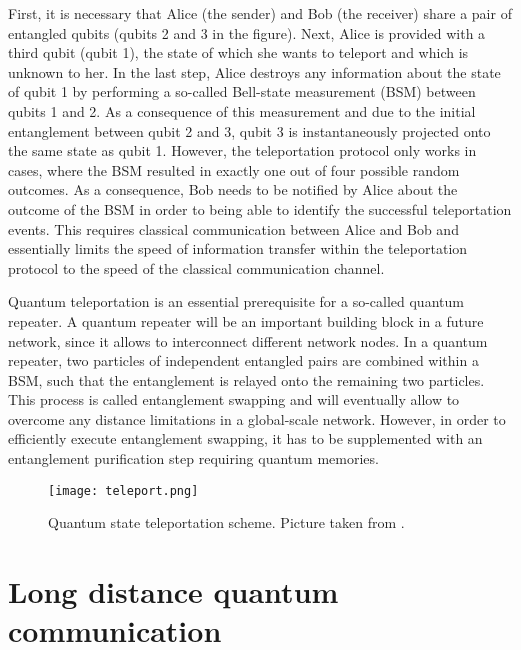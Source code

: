\documentclass{article}
\begin{document}
First, it is necessary that Alice (the sender) and Bob (the receiver) share a pair of entangled qubits (qubits 2 and 3 in the figure). Next, Alice is provided with a third qubit (qubit 1), the state of which she wants to teleport and which is unknown to her. In the last step, Alice destroys any information about the state of qubit 1 by performing a so-called Bell-state measurement (BSM) between qubits 1 and 2. As a consequence of this measurement and due to the initial entanglement between qubit 2 and 3, qubit 3 is instantaneously projected onto the same state as qubit 1. However, the teleportation protocol only works in cases, where the BSM resulted in exactly one out of four possible random outcomes. As a consequence, Bob needs to be notified by Alice about the outcome of the BSM in order to being able to identify the successful teleportation events. This requires classical communication between Alice and Bob and essentially limits the speed of information transfer within the teleportation protocol to the speed of the classical communication channel.

Quantum teleportation is an essential prerequisite for a so-called quantum repeater. A quantum repeater will be an important building block in a future network, since it allows to interconnect different network nodes. In a quantum repeater, two particles of independent entangled pairs are combined within a BSM, such that the entanglement is relayed onto the remaining two particles. This process is called entanglement swapping and will eventually allow to overcome any distance limitations in a global-scale network. However, in order to efficiently execute entanglement swapping, it has to be supplemented with an entanglement purification step requiring quantum memories.  


\begin{figure}[h!]
\centering
\texttt{[image: teleport.png]}
\caption{Quantum state teleportation scheme. Picture taken from \cite{bouwmeester1997experimental}.}
\label{fig:teleport_scheme}
\end{figure}

\section{Long distance quantum communication}
\end{document}
